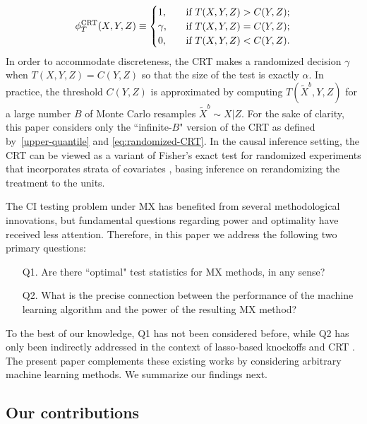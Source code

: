 \documentclass[ejs]{imsart}
\numberwithin{equation}{section}
\theoremstyle{plain}
\theoremstyle{definition}
\theoremstyle{remark}
\newcommand{\srx}{X}
\newcommand{\srz}{Z}
\newcommand{\srxk}{\widetilde X}
\newcommand{\sry}{Y}
\def\CRT{\textnormal{CRT}}
\begin{document}
\begin{equation}
	\label{eq:randomized-CRT}
	\phi^{\CRT}_T(\srx,\sry,\srz) \equiv 
	\begin{cases}
		1, \quad &\text{if }  T(\srx, \sry, \srz) > C(\sry,\srz); \\
		\gamma, \quad &\text{if }  T(\srx, \sry, \srz) = C(\sry,\srz); \\
		0, \quad &\text{if }T(\srx, \sry, \srz) < C(\sry,\srz).
	\end{cases}
\end{equation}
In order to accommodate discreteness, the CRT makes a randomized decision $\gamma$ when $T(\srx, \sry, \srz) = C(\sry,\srz)$ so that the size of the test is exactly $\alpha$. In practice, the threshold $C(\sry,\srz)$ is approximated by computing $T(\srxk^b, \sry, \srz)$ for a large number $B$ of Monte Carlo resamples $\srxk^b \sim \srx|\srz$. For the sake of clarity, this paper considers only the ``infinite-$B$" version of the CRT as defined by~\eqref{upper-quantile} and \eqref{eq:randomized-CRT}. In the causal inference setting, the CRT can be viewed as a variant of Fisher's exact test for randomized experiments that incorporates strata of covariates \citep{Zheng2008,Hennessy2016}, basing inference on rerandomizing the treatment to the units. 

The CI testing problem under MX has benefited from several methodological innovations, but fundamental questions regarding power and optimality have received less attention. Therefore, in this paper we address the following two primary questions:
\begin{enumerate}
	\item[Q1.] Are there ``optimal" test statistics for MX methods, in any sense?
	\item[Q2.] What is the precise connection between the performance of the machine learning algorithm and the power of the resulting MX method?
\end{enumerate}
To the best of our knowledge, Q1 has not been considered before, while Q2 has only been indirectly addressed in the context of lasso-based knockoffs \citep{Weinstein2017, Liu2019, Fan2020, Weinstein2020} and CRT \citep{Wang2020b, Celentano2020}. The present paper complements these existing works by considering arbitrary machine learning methods. We summarize our findings next.

\subsection{Our contributions}
\end{document}
